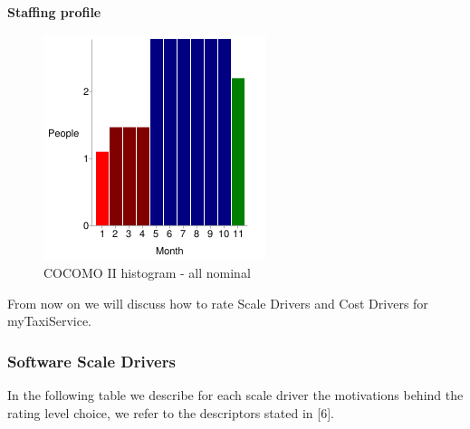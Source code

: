\textbf{Staffing profile}

\noindent \begin{center}
\begin{figure}[H]
\noindent \begin{centering}
\includegraphics{COCOMOII/images/allnominal}
\par\end{centering}

\protect\caption{COCOMO II histogram - all nominal}
\end{figure}

\par\end{center}

From now on we will discuss how to rate Scale Drivers and Cost Drivers
for myTaxiService.


\subsubsection{Software Scale Drivers}

In the following table we describe for each scale driver the motivations
behind the rating level choice, we refer to the descriptors stated
in {[}6{]}.

